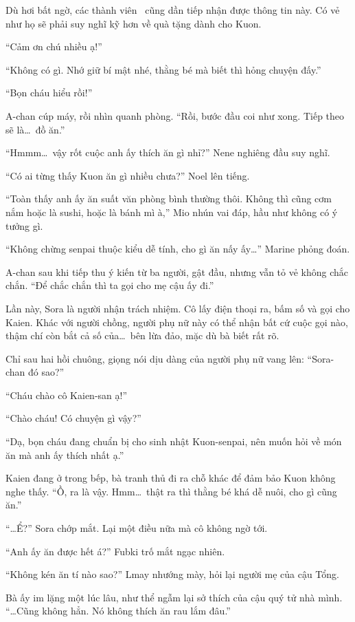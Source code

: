 \documentclass[../main.tex]{subfiles}
\begin{document}
Dù hơi bất ngờ, các thành viên \hll\ cũng dần tiếp nhận được thông tin này. Có vẻ như họ sẽ phải suy nghĩ kỹ hơn về quà tặng dành cho Kuon.

``Cảm ơn chú nhiều ạ!''

``Không có gì. Nhớ giữ bí mật nhé, thằng bé mà biết thì hỏng chuyện đấy.''

``Bọn cháu hiểu rồi!''

A-chan cúp máy, rồi nhìn quanh phòng. ``Rồi, bước đầu coi như xong. Tiếp theo sẽ là\dots\ đồ ăn.''

``Hmmm\dots\ vậy rốt cuộc anh ấy thích ăn gì nhỉ?'' Nene nghiêng đầu suy nghĩ.

``Có ai từng thấy Kuon ăn gì nhiều chưa?'' Noel lên tiếng.

``Toàn thấy anh ấy ăn suất văn phòng bình thường thôi. Không thì cũng cơm nắm hoặc là sushi, hoặc là bánh mì à,'' Mio nhún vai đáp, hầu như không có ý tưởng gì.

``Không chừng senpai thuộc kiểu dễ tính, cho gì ăn nấy ấy\dots'' Marine phỏng đoán.

A-chan sau khi tiếp thu ý kiến từ ba người, gật đầu, nhưng vẫn tỏ vẻ không chắc chắn. ``Để chắc chắn thì ta gọi cho mẹ cậu ấy đi.''

Lần này, Sora là người nhận trách nhiệm. Cô lấy điện thoại ra, bấm số và gọi cho Kaien. Khác với người chồng, người phụ nữ này có thể nhận bất cứ cuộc gọi nào, thậm chí còn bắt cả số của\dots\ bên lừa đảo, mặc dù bà biết rất rõ.

Chỉ sau hai hồi chuông, giọng nói dịu dàng của người phụ nữ vang lên: ``Sora-chan đó sao?''

``Cháu chào cô Kaien-san ạ!''

``Chào cháu! Có chuyện gì vậy?''

``Dạ, bọn cháu đang chuẩn bị cho sinh nhật Kuon-senpai, nên muốn hỏi về món ăn mà anh ấy thích nhất ạ.''

Kaien đang ở trong bếp, bà tranh thủ đi ra chỗ khác để đảm bảo Kuon không nghe thấy. ``Ồ, ra là vậy. Hmm\dots\ thật ra thì thằng bé khá dễ nuôi, cho gì cũng ăn.''

``\dots Ể?'' Sora chớp mắt. Lại một điều nữa mà cô không ngờ tới.

``Anh ấy ăn được hết á?'' Fubki trố mắt ngạc nhiên.

``Không kén ăn tí nào sao?'' Lmay nhướng mày, hỏi lại người mẹ của cậu Tổng.

Bà ấy im lặng một lúc lâu, như thể ngẫm lại sở thích của cậu quý tử nhà mình. ``\dots Cũng không hẳn. Nó không thích ăn rau lắm đâu.''
\end{document}
